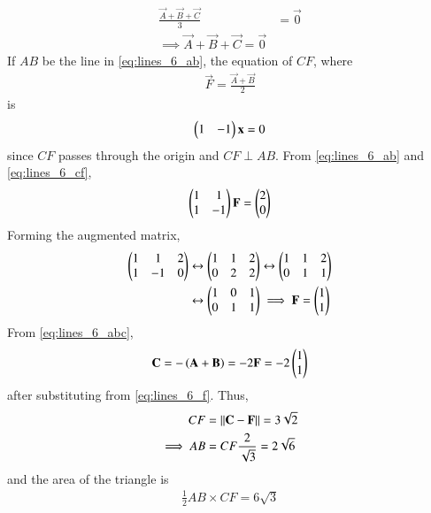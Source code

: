 \documentclass[journal,12pt,twocolumn]{IEEEtran}
\begin{document}
\begin{enumerate}[label=\arabic*]
\begin{align}
\frac{\vec{A}+\vec{B}+\vec{C}}{3} &= \vec{0}
\nonumber \\
\implies 
\vec{A}+\vec{B}+\vec{C} = \vec{0}
\label{eq:lines_6_abc}
\end{align}
%
If $AB$ be the line in \eqref{eq:lines_6_ab},
the equation of 
$CF$, where 
\begin{align}
\vec{F} = \frac{\vec{A}+\vec{B}}{2} 
\end{align}
is 
%
\begin{align}
\label{eq:lines_6_cf}
\begin{pmatrix}1 & -1\end{pmatrix}\mathbf{x} = 0
\end{align}
since $CF$ passes through the origin and $CF\perp AB$. From \eqref{eq:lines_6_ab}
and \eqref{eq:lines_6_cf},
\begin{align}
\label{eq:lines_6_fmat}
\begin{pmatrix}1 & 1 \\1 & -1\end{pmatrix}\mathbf{F} = \begin{pmatrix}2 \\ 0\end{pmatrix}
\end{align}
%
Forming the augmented matrix, 
\begin{align}
\begin{pmatrix}1 & 1 &2 \\1 & -1 & 0\end{pmatrix} &\leftrightarrow \begin{pmatrix}1 & 1 &2 \\0 & 2 & 2\end{pmatrix} \leftrightarrow \begin{pmatrix}1 & 1 &2 \\0 & 1 & 1\end{pmatrix} 
\nonumber \\
&\leftrightarrow \begin{pmatrix}1 & 0 &1 \\0 & 1 & 1\end{pmatrix} \implies \mathbf{F} = \begin{pmatrix}1 \\ 1\end{pmatrix}
\label{eq:lines_6_f}
\end{align}
From \eqref{eq:lines_6_abc},
\begin{align}
\mathbf{C}=-\left(\mathbf{A}+\mathbf{B}\right)=-2\mathbf{F} = -2\begin{pmatrix}1 \\ 1\end{pmatrix}
\label{eq:lines_6_c}
\end{align}
after substituting from \eqref{eq:lines_6_f}.  Thus, 
\begin{align}
CF &= \lVert\mathbf{C}-\mathbf{F}\rVert = 3\sqrt{2} 
\\
\implies AB &=  CF\frac{2}{\sqrt{3}} = 2\sqrt{6}
\label{eq:lines_6_cflen}
\end{align}
and the area of the triangle is 
\begin{align}
\frac{1}{2} AB \times CF = 6\sqrt{3}
\end{align}



\end{enumerate}
\end{document}
